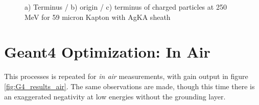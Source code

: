 \documentclass{article}
\begin{document}
\begin{figure}[H]
\centering
{}
\caption{a) Terminus / b) origin / c) terminus of charged particles at 250 MeV for 59 micron Kapton with AgKA sheath}
\label{fig:G4_stats_AgKA_vac}
\end{figure}

\section{Geant4 Optimization: In Air}

This processes is repeated for \emph{in air} measurements, with gain output in figure \ref{fig:G4_results_air}.  The same observations are made, though this time there is an exaggerated negativity at low energies without the grounding layer.
\end{document}
